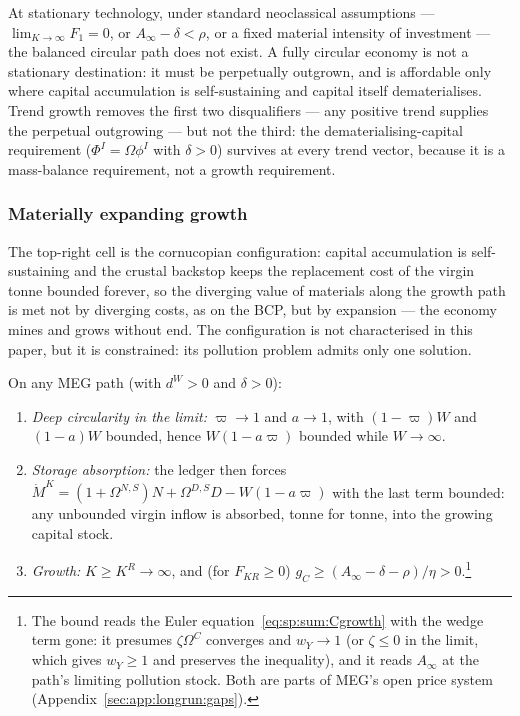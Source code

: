 \begin{remark}\label{rem:sp:lr:neoclassical}
At stationary technology, under standard neoclassical assumptions ---
$\lim_{K\to\infty}F_1=0$, or $A_\infty-\delta<\rho$,
or a fixed material intensity of investment --- the balanced circular path does not exist. A
fully circular economy is not a stationary destination: it must be perpetually outgrown, and is
affordable only where capital accumulation is self-sustaining and capital itself
dematerialises. Trend growth removes the first two disqualifiers --- any positive trend
supplies the perpetual outgrowing --- but not the third: the dematerialising-capital
requirement ($\Phi^I=\Omega\phi^I$ with $\delta>0$) survives at every trend vector, because
it is a mass-balance requirement, not a growth requirement.
\end{remark}

\subsubsection{Materially expanding growth}\label{sec:sp:longrun:path:meg}

The top-right cell is the cornucopian configuration: capital accumulation is self-sustaining
and the crustal backstop keeps the replacement cost of the virgin tonne bounded forever, so the
diverging value of materials along the growth path is met not by diverging costs, as on the
BCP, but by expansion --- the economy mines and grows without end. The configuration is not
characterised in this paper, but it is constrained: its pollution problem admits only one
solution.

\begin{proposition}\label{prop:sp:lr:meg}
On any MEG path (with $d^W>0$ and $\delta>0$):
\begin{enumerate}
    \item \emph{Deep circularity in the limit:} $\varpi\to1$ and $a\to1$, with
    $\left(1-\varpi\right)W$ and $\left(1-a\right)W$ bounded, hence
    $W\left(1-a\varpi\right)$ bounded while $W\to\infty$.
    \item \emph{Storage absorption:} the ledger then forces
    $\dot M^K=\left(1+\Omega^{N,S}\right)N+\Omega^{D,S}D-W\left(1-a\varpi\right)$ with the last
    term bounded: any unbounded virgin inflow is absorbed, tonne for tonne, into the growing
    capital stock.
    \item \emph{Growth:} $K\ge K^R\to\infty$, and (for $F_{KR}\ge0$)
    $g_C\ge\left(A_\infty-\delta-\rho\right)/\eta>0$.\footnote{The bound reads the Euler
    equation~\eqref{eq:sp:sum:Cgrowth} with the wedge term gone: it presumes $\zeta\Omega^C$
    converges and $w_Y\to1$ (or $\zeta\le0$ in the limit, which gives $w_Y\ge1$ and preserves
    the inequality), and it reads $A_\infty$ at the path's limiting pollution stock. Both are
    parts of MEG's open price system (Appendix~\ref{sec:app:longrun:gaps}).}
\end{enumerate}
\end{proposition}


